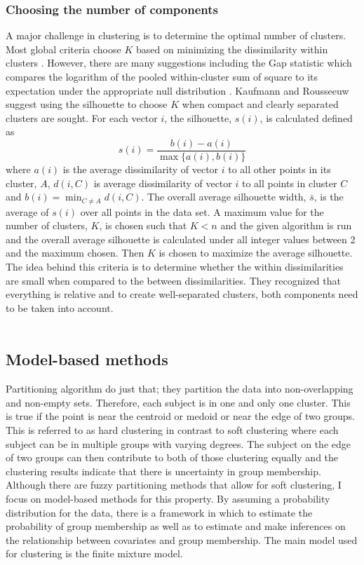 \documentclass[12pt]{article}
\begin{document}
\subsubsection{Choosing the number of components}
A major challenge in clustering is to determine the optimal number of clusters. Most global criteria choose $K$ based on minimizing the dissimilarity within clusters \cite{gordon1999}. However, there are many suggestions including the Gap statistic which compares the logarithm of the pooled within-cluster sum of square to its expectation under the appropriate null distribution \cite{tibshirani2001}. Kaufmann and Rousseeuw suggest using the silhouette to choose $K$ \cite{kaufmann1990} when compact and clearly separated clusters are sought. For each vector $i$, the silhouette, $s(i)$, is calculated defined as
$$s(i)=\frac{b(i)-a(i)}{\max\{a(i),b(i)\}}$$
where $a(i)$ is the average dissimilarity of  vector $i$ to all other points in its cluster, $A$, $d(i,C)$ is average dissimilarity of vector $i$ to all points in cluster $C$ and $b(i)=\min_{C\not= A} d(i,C)$. The overall average silhouette width, $\bar{s}$, is the average of $s(i)$ over all points in the data set. A maximum value for the number of clusters, $K$, is chosen such that $K<n$ and the given algorithm is run and the overall average silhouette is calculated under all integer values between 2 and the maximum chosen. Then $K$ is chosen to maximize the average silhouette. The idea behind this criteria is to determine whether the within dissimilarities are small when compared to the between dissimilarities. They recognized that everything is relative and to create well-separated clusters, both components need to be taken into account.\\\\

\subsection{Model-based methods}
Partitioning algorithm do just that; they partition the data into non-overlapping and non-empty sets. Therefore, each subject is in one and only one cluster. This is true if the point is near the centroid or medoid or near the edge of two groups. This is referred to as hard clustering in contrast to soft clustering where each subject can be in multiple groups with varying degrees. The subject on the edge of two groups can then contribute to both of those clustering equally and the clustering results indicate that there is uncertainty in group membership. Although there are fuzzy partitioning methods that allow for soft clustering, I focus on model-based methods for this property. By assuming a probability distribution for the data, there is a framework in which to estimate the probability of group membership as well as to estimate and make inferences on the relationship between covariates and group membership. The main model used for clustering is the finite mixture model. 
\end{document}
